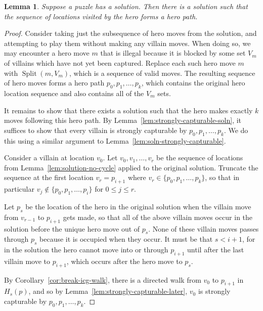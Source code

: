 \documentclass[11pt,letterpaper]{article}
\newcommand{\BreakText}{Split}
\newcommand{\BreakFunc}{\operatorname{\BreakText}}
\newcommand{\Break}[2]{{\BreakFunc({#1}, {#2})}}
\theoremstyle{plain}
\newtheorem{lemma}[theorem]{Lemma}
\theoremstyle{definition}
\theoremstyle{remark}
\numberwithin{equation}{section}
\begin{document}
\begin{lemma} \label{lem:hero path}
  Suppose a puzzle has a solution.
  Then there is a solution such that the sequence of locations
  visited by the hero forms a hero path.
\end{lemma}
\begin{proof}
  Consider taking just the subsequence of hero moves from the solution,
  and attempting to play them without making any villain moves.
  When doing so, we may encounter a hero move \(m\)
  that is illegal because it is blocked by some set \(V_m\) of villains
  which have not yet been captured.
  Replace each such hero move \(m\) with \(\Break{m}{V_m}\),
  which is a sequence of valid moves.
  The resulting sequence of hero moves forms a hero path
  \(p_0, p_1, \ldots, p_k\),
  which contains the original hero location sequence
  and also contains all of the \(V_m\) sets.

  It remains to show that there exists a solution such that
  the hero makes exactly $k$ moves following this hero path.
  By Lemma~\ref{lem:strongly-capturable-soln}, it suffices to show that
  every villain is strongly capturable by \(p_0, p_1, \ldots, p_k\).
  We do this using a similar argument to Lemma~\ref{lem:soln-strongly-capturable}.

  Consider a villain at location \(v_0\).
  Let \(v_0, v_1, \dots, v_r\) be the sequence of locations from
  Lemma~\ref{lem:solution-no-cycle} applied to the original solution.
  Truncate the sequence at the first location \(v_r = p_{i+1}\)
  where \(v_r \in \{p_0, p_1, \ldots, p_k\}\),
  so that in particular \(v_j \notin \{p_0, p_1, \ldots, p_i\}\)
  for \(0 \leq j \le r\).

  Let \(p_s\) be the location of the hero in the original solution
  when the villain move from \(v_{r-1}\) to \(p_{i+1}\) gets made,
  so that all of the above villain moves occur in the solution
  before the unique hero move out of \(p_s\).
  None of these villain moves passes through \(p_s\)
  because it is occupied when they occur.
  It must be that \(s < i + 1\),
  for in the solution the hero cannot move into or through \(p_{i+1}\)
  until after the last villain move to \(p_{i+1}\),
  which occurs after the hero move to \(p_s\).

  By Corollary~\ref{cor:break-icg-walk},
  there is a directed walk from \(v_0\) to \(p_{i+1}\) in \(H_s(p)\),
  and so by Lemma~\ref{lem:strongly-capturable-later},
  \(v_0\) is strongly capturable by \(p_0, p_1, \ldots, p_k\).
\end{proof}
\end{document}
